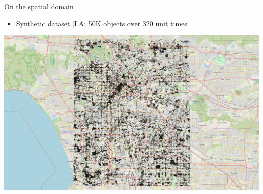 \documentclass{beamer}
\begin{document}
     \begin{frame}{On the spatial domain}
        \begin{itemize} \item Synthetic dataset [LA: 50K objects over 320 unit times]\end{itemize} \vspace{0.5cm}

         \centering
         \includegraphics[width=\textwidth]{figures/LA_T320_N50K.png}
     \end{frame}
\end{document}
